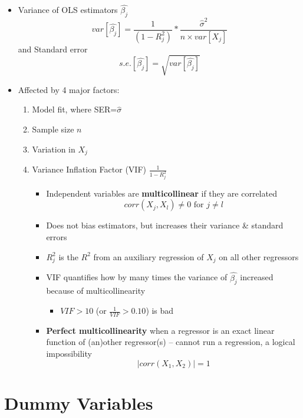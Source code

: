 \documentclass{article}
\begin{document}
\begin{itemize}
\begin{figure}[h!]
	\end{figure}
	\item Variance of OLS estimators $\hat{\beta_j}$
			\begin{equation*}
		var[\hat{\beta_j}]=\frac{1}{(1-R^2_j)}*\frac{\hat{\sigma}^2}{n\times var[X_j]}
		\end{equation*}
	and Standard error 
		\begin{equation*}
		s.e.[\hat{\beta_j}]=\sqrt{var[\hat{\beta_j}]}
		\end{equation*}
	\item Affected by 4 major factors: 
	\begin{enumerate}
		\item Model fit, where SER=$\hat{\sigma}$
		\item Sample size $n$
		\item Variation in $X_j$
		\item Variance Inflation Factor (VIF) $\frac{1}{1-R^2_j}$
		\begin{itemize}
			\item Independent variables are \textbf{multicollinear} if they are correlated 
			\begin{equation*}
				corr(X_j, X_l) \neq 0 \text{ for } j \neq l
			\end{equation*}
			\item Does not bias estimators, but increases their variance \& standard errors 
			\item $R^2_j$ is the $R^2$ from an auxiliary regression of $X_j$ on all other regressors
			\item VIF quantifies how by many times the variance of $\hat{\beta_j}$ increased because of multicollinearity
			\begin{itemize}
				\item $VIF>10$ (or $\frac{1}{VIF}>0.10$) is bad 
			\end{itemize}
			\item \textbf{Perfect multicollinearity} when a regressor is an exact linear function of (an)other regressor(s) -- cannot run a regression, a logical impossibility 
			\begin{equation*}
			|corr(X_1, X_2)| = 1	
			\end{equation*}
		\end{itemize}
	\end{enumerate}
\end{itemize}

\clearpage 

\section*{Dummy Variables}
\end{document}
